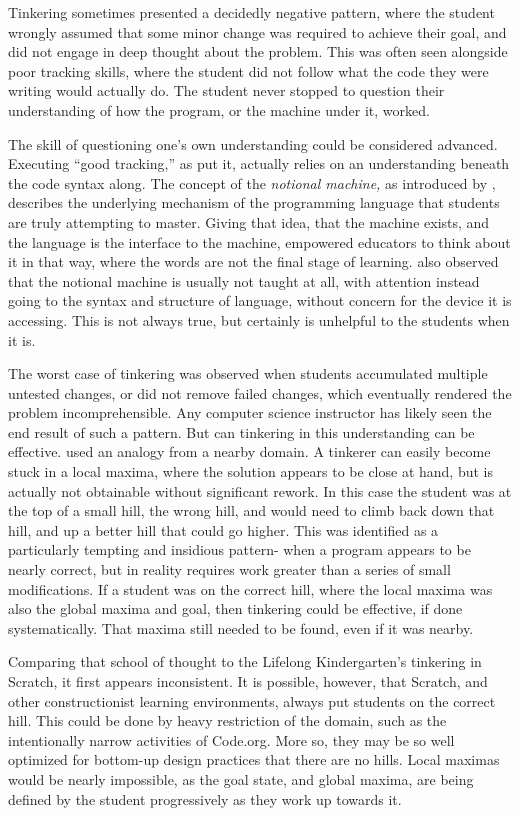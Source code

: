 Tinkering sometimes presented a decidedly negative pattern, where the student wrongly assumed that some minor change was required to achieve their goal, and did not engage in deep thought about the problem. This was often seen alongside poor tracking skills, where the student did not follow what the code they were writing would actually do. The student never stopped to question their understanding of how the program, or the machine under it, worked.

The skill of questioning one's own understanding could be considered advanced. Executing ``good tracking,'' as \citet{perkins-1986} put it, actually relies on an understanding beneath the code syntax along. The concept of the \emph{notional machine,} as introduced by \citet{duboulay-1986}, describes the underlying mechanism of the programming language that students are truly attempting to master. Giving that idea, that the machine exists, and the language is the interface to the machine, empowered educators to think about it in that way, where the words are not the final stage of learning. \citeauthor{duboulay-1986} also observed that the notional machine is usually not taught at all, with attention instead going to the syntax and structure of language, without concern for the device it is accessing. This is not always true, but certainly is unhelpful to the students when it is. 

The worst case of tinkering was observed when students accumulated multiple untested changes, or did not remove failed changes, which eventually rendered the problem incomprehensible. Any computer science instructor has likely seen the end result of such a pattern. But can tinkering in this understanding can be effective. \citeauthor{perkins-1986} used an analogy from a nearby domain. A tinkerer can easily become stuck in a local maxima, where the solution appears to be close at hand, but is actually not obtainable without significant rework. In this case the student was at the top of a small hill, the wrong hill, and would need to climb back down that hill, and up a better hill that could go higher. This was identified as a particularly tempting and insidious pattern- when a program appears to be nearly correct, but in reality requires work greater than a series of small modifications. If a student was on the correct hill, where the local maxima was also the global maxima and goal, then tinkering could be effective, if done systematically. That maxima still needed to be found, even if it was nearby.

Comparing that school of thought to the Lifelong Kindergarten's tinkering in Scratch, it first appears inconsistent. It is possible, however, that Scratch, and other constructionist learning environments, always put students on the correct hill. This could be done by heavy restriction of the domain, such as the intentionally narrow activities of Code.org. More so, they may be so well optimized for bottom-up design practices that there are no hills. Local maximas would be nearly impossible, as the goal state, and global maxima, are being defined by the student progressively as they work up towards it. 

